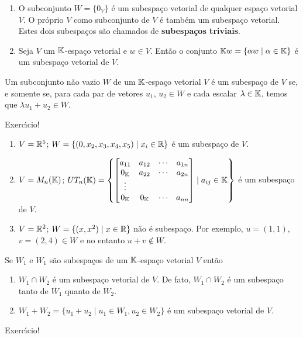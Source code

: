 \begin{exemplo}
	\begin{enumerate}[label={\arabic*})]
		\item O subconjunto $W = \{0_V\}$ \'e um subespa\c{c}o vetorial de qualquer espa\c{c}o vetorial $V$. O pr\'oprio $V$ como subconjunto de $V$ \'e tamb\'em um subespa\c{c}o vetorial. Estes dois subespa\c{c}os s\~ao chamados de \textbf{subespa\c{c}os triviais}.
		\item Seja $V$ um $\mathbb{K}$-espa\c{c}o vetorial e $w \in V$. Ent\~ao o conjunto $\mathbb{K}w = \{\alpha w \mid \alpha \in \mathbb{K}\}$ \'e um subespa\c{c}o vetorial de $V$.
	\end{enumerate}
\end{exemplo}

\begin{teorema}
	Um subconjunto n\~ao vazio $W$ de um $\mathbb{K}$-espa\c{c}o vetorial $V$ \'e um subespa\c{c}o de $V$ se, e somente se, para cada par de vetores $u_1$, $u_2 \in W$ e cada escalar $\lambda \in \mathbb{K}$, temos que $\lambda u_1 + u_2 \in W$.
\end{teorema}
\begin{prova}
	Exerc{\'\i}cio!
\end{prova}

\begin{exemplo}
	\begin{enumerate}[label={\arabic*})]
		\item $V = \mathbb{R}^5$; $W = \{(0,x_2,x_3,x_4,x_5) \mid x_i \in \mathbb{R}\}$ \'e um subespa\c{c}o de $V$.
		\item $V = M_n(\mathbb{K})$; $UT_n(\mathbb{K}) = \left\{\begin{bmatrix}
			a_{11} & a_{12} & \cdots & a_{1n}\\
			0_{\mathbb{K}} & a_{22} & \cdots & a_{2n}\\
			\vdots\\
			0_{\mathbb{K}} & 0_{\mathbb{K}} & \cdots & a_{nn}
		\end{bmatrix} \mid a_{ij} \in \mathbb{K}\right\}$ \'e um subespa\c{c}o de $V$.
		\item $V = \mathbb{R}^2$; $W = \{(x,x^2) \mid x \in \mathbb{R}\}$ n\~ao \'e subespa\c{c}o. Por exemplo, $u = (1,1)$, $v = (2,4) \in W$ e no entanto $u + v \notin W$.
	\end{enumerate}
\end{exemplo}

\begin{proposicao}
	Se $W_1$ e $W_1$ s\~ao subespa\c{c}os de um $\mathbb{K}$-espa\c{c}o vetorial $V$ ent\~ao
	\begin{enumerate}[label={\roman*})]
		\item $W_1 \cap W_2$ \'e um subespa\c{c}o vetorial de $V$. De fato, $W_1 \cap W_2$ \'e um subespa\c{c}o tanto de $W_1$ quanto de $W_2$.
		\item $W_1 + W_2 = \{u_1 + u_2 \mid u_1 \in W_1, u_2 \in W_2\}$ \'e um subespa\c{c}o vetorial de $V$.
	\end{enumerate}
\end{proposicao}
\begin{prova}
	Exerc{\'\i}cio!
\end{prova}

